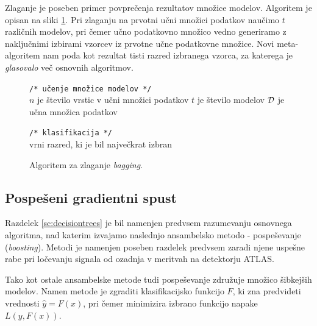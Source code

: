 \documentclass[11pt,a4paper,openany]{book}
\begin{document}
Zlaganje je poseben primer povprečenja rezultatov množice modelov. Algoritem je opisan na sliki \ref{sl:algo-bagging}. Pri zlaganju na prvotni učni množici podatkov naučimo $t$ različnih modelov, pri čemer učno podatkovno množico vedno generiramo z naključnimi izbirami vzorcev iz prvotne učne podatkovne množice. Novi meta-algoritem nam poda kot rezultat tisti razred izbranega vzorca, za katerega je \textit{glasovalo} več osnovnih algoritmov.

\begin{figure}[h!]
	\begin{algorithm}[H]
		\texttt{/* učenje množice modelov */}\\
		$n$ je število vrstic v učni množici podatkov\;
		$t$ je število modelov\;
		${\cal D}$ je učna množica podatkov\;

		\texttt{/* klasifikacija */} \\
		vrni razred, ki je bil največkrat izbran
	\end{algorithm}
	\caption{Algoritem za zlaganje \textit{bagging}.}
	\label{sl:algo-bagging}	
\end{figure}

\subsection{Pospešeni gradientni spust}
\label{sec:boosting}
Razdelek \ref{sc:decisiontrees} je bil namenjen predvsem razumevanju osnovnega algoritma, nad katerim izvajamo naslednjo ansambelsko metodo - pospeševanje (\textit{boosting}). Metodi je namenjen poseben razdelek predvsem zaradi njene uspešne rabe pri ločevanju signala od ozadnja v meritvah na detektorju ATLAS.

Tako kot ostale ansambelske metode tudi pospeševanje združuje množico šibkejših modelov\cite{Witten2005}. Namen metode je zgraditi klasifikacijsko funkcijo $F$, ki zna predvideti vrednosti $\hat{y} = F(x)$, pri čemer minimizira izbrano funkcijo napake $L(y, F(x))$.
\end{document}

